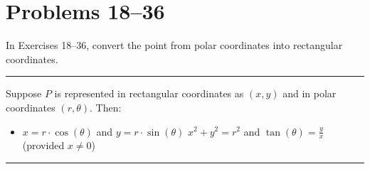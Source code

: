 \section{Problems 18--36}

In Exercises 18--36, convert the point from polar coordinates into rectangular coordinates. \medskip \hrule \bigskip

\begin{theorem}
    Suppose $P$ is represented in rectangular coordinates as $(x,y)$ and in polar coordinates $(r, \theta)$. Then:
    
    \begin{itemize}
        \item $x = r \cdot \cos(\theta)$ and $y = r \cdot \sin(\theta)$
        $x^2 + y^2 = r^2$ and $\tan(\theta) = \frac{y}{x}$ (provided $x \neq 0$)
    \end{itemize}
\end{theorem}
\hrule \bigskip